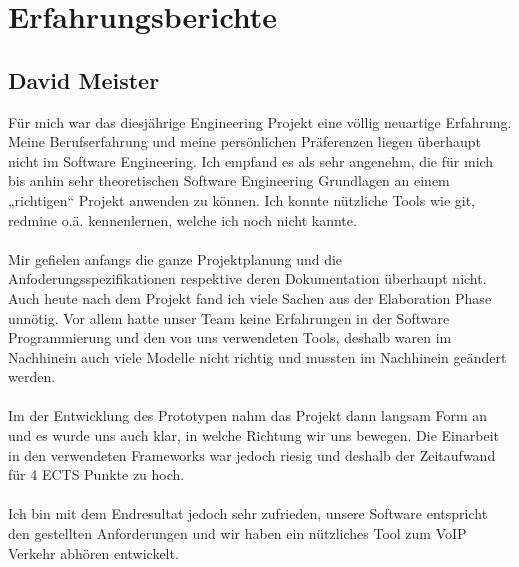 \documentclass[a4,12pt]{scrartcl}
\begin{document}
\newpage
\section{Erfahrungsberichte}
\subsection{David Meister}
Für mich war das diesjährige Engineering Projekt eine völlig neuartige Erfahrung. Meine Berufserfahrung und meine persönlichen Präferenzen liegen überhaupt nicht im Software Engineering. Ich empfand es als sehr angenehm, die für mich bis anhin sehr theoretischen Software Engineering Grundlagen an einem „richtigen“ Projekt anwenden zu können. Ich konnte nützliche Tools wie git, redmine o.ä. kennenlernen, welche ich noch nicht kannte.\\
\\
Mir gefielen anfangs die ganze Projektplanung und die Anfoderungsspezifikationen respektive deren Dokumentation überhaupt nicht. Auch heute nach dem Projekt fand ich viele Sachen aus der Elaboration Phase unnötig. Vor allem hatte unser Team keine Erfahrungen in der Software Programmierung und den von uns verwendeten Tools, deshalb waren im Nachhinein auch viele Modelle nicht richtig und mussten im Nachhinein geändert werden.\\
\\
Im der Entwicklung des Prototypen nahm das Projekt dann langsam Form an und es wurde uns auch klar, in welche Richtung wir uns bewegen. Die Einarbeit in den verwendeten Frameworks war jedoch riesig und deshalb der Zeitaufwand für 4 ECTS Punkte zu hoch.\\
\\
Ich bin mit dem Endresultat jedoch sehr zufrieden, unsere Software entspricht den gestellten Anforderungen und wir haben ein nützliches Tool zum VoIP Verkehr abhören entwickelt.
\end{document}
